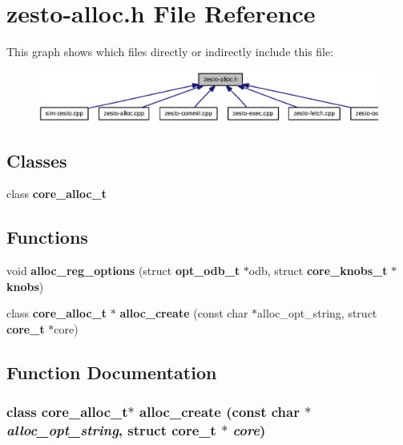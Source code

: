 \section{zesto-alloc.h File Reference}
\label{zesto-alloc_8h}


This graph shows which files directly or indirectly include this file:\nopagebreak
\begin{figure}[H]
\begin{center}
\leavevmode
\includegraphics[width=321pt]{zesto-alloc_8h__dep__incl}
\end{center}
\end{figure}
\subsection*{Classes}
\begin{CompactItemize}
\item 
class {\bf core\_\-alloc\_\-t}
\end{CompactItemize}
\subsection*{Functions}
\begin{CompactItemize}
\item 
void {\bf alloc\_\-reg\_\-options} (struct {\bf opt\_\-odb\_\-t} $\ast$odb, struct {\bf core\_\-knobs\_\-t} $\ast${\bf knobs})
\item 
class {\bf core\_\-alloc\_\-t} $\ast$ {\bf alloc\_\-create} (const char $\ast$alloc\_\-opt\_\-string, struct {\bf core\_\-t} $\ast$core)
\end{CompactItemize}


\subsection{Function Documentation}
\subsubsection[{alloc\_\-create}]{\setlength{\rightskip}{0pt plus 5cm}class {\bf core\_\-alloc\_\-t}$\ast$ alloc\_\-create (const char $\ast$ {\em alloc\_\-opt\_\-string}, \/  struct {\bf core\_\-t} $\ast$ {\em core})}\label{zesto-alloc_8h_d5e0575b7db14c11053d5da87dab1708}




